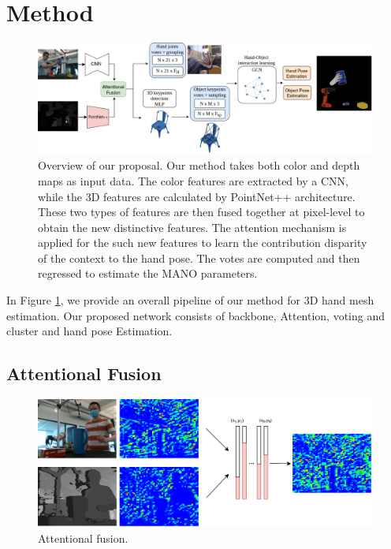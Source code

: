 \section{Method}
\label{sec:methodology}

\begin{figure}[t]
	\centering
	\includegraphics[width=0.95\linewidth]{Figs/Hand-Object_pose.png}
	\caption{Overview of our proposal. Our method takes both color and depth maps as input data. The color features are extracted by a CNN, while the 3D features are calculated by PointNet++ architecture. These two types of features are then fused together at pixel-level to obtain the new distinctive features. The attention mechanism is applied for the such new features to learn the contribution disparity of the context to the hand pose. The votes are computed and then regressed to estimate the MANO parameters.}
	\label{fig:Hand_pose}
\end{figure}

In Figure \ref{fig:Hand_pose}, we provide an overall pipeline of our method for 3D hand mesh estimation. Our proposed network consists of backbone, Attention, voting and cluster and hand pose Estimation.

\subsection{Attentional Fusion}
\label{sec:attentional_fusion}

\begin{figure}[h!]
	\centering
	\includegraphics[width=0.9\linewidth]{Figs/Attentional_fusion.png}
	\caption{Attentional fusion.}
	\label{fig:attentional_fusion}
\end{figure}

